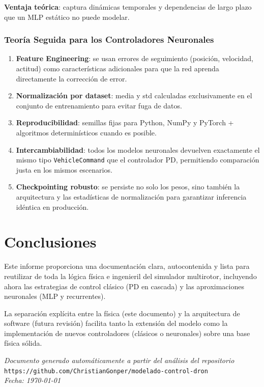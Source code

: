 \documentclass[12pt,a4paper]{article}
\begin{document}
\textbf{Ventaja teórica}: captura dinámicas temporales y dependencias de largo plazo que un MLP estático no puede modelar.

\subsubsection{Teoría Seguida para los Controladores Neuronales}

\begin{enumerate}
    \item \textbf{Feature Engineering}: se usan errores de seguimiento (posición, velocidad, actitud) como características adicionales para que la red aprenda directamente la corrección de error.
    \item \textbf{Normalización por dataset}: media y std calculadas exclusivamente en el conjunto de entrenamiento para evitar fuga de datos.
    \item \textbf{Reproducibilidad}: semillas fijas para Python, NumPy y PyTorch + algoritmos determinísticos cuando es posible.
    \item \textbf{Intercambiabilidad}: todos los modelos neuronales devuelven exactamente el mismo tipo \texttt{VehicleCommand} que el controlador PD, permitiendo comparación justa en los mismos escenarios.
    \item \textbf{Checkpointing robusto}: se persiste no solo los pesos, sino también la arquitectura y las estadísticas de normalización para garantizar inferencia idéntica en producción.
\end{enumerate}

\section{Conclusiones}

Este informe proporciona una documentación clara, autocontenida y lista para reutilizar de toda la lógica física e ingenieril del simulador multirotor, incluyendo ahora las estrategias de control clásico (PD en cascada) y las aproximaciones neuronales (MLP y recurrentes).

La separación explícita entre la física (este documento) y la arquitectura de software (futura revisión) facilita tanto la extensión del modelo como la implementación de nuevos controladores (clásicos o neuronales) sobre una base física sólida.

\vspace{1cm}
\begin{center}
\textit{Documento generado automáticamente a partir del análisis del repositorio}\\
\texttt{https://github.com/ChristianGonper/modelado-control-dron}\\
\textit{Fecha: \today}
\end{center}
\end{document}

